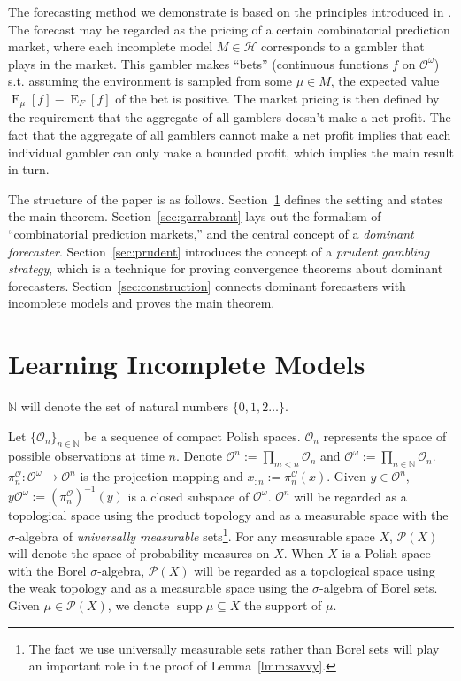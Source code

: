 \documentclass[11pt]{article}
\theoremstyle{definition}
\theoremstyle{plain}
\newcommand{\Nats}{\mathbb{N}}
\newcommand{\Sq}[2]{\{#1\}_{#2 \in \Nats}}
\newcommand{\Sqn}[1]{\Sq{#1}{n}}
\DeclareMathOperator{\E}{E}
\newcommand{\PM}{\mathcal{P}}
\DeclareMathOperator{\Sp}{supp}
\newcommand{\Ob}{\mathcal{O}}
\newcommand{\OO}{\Ob^\omega}
\newcommand{\PO}{\pi^\Ob}
\newcommand{\MC}{\mathcal{H}}
\begin{document}
The forecasting method we demonstrate is based on the principles introduced in \cite{Garrabrant_2016}. The forecast may be regarded as the pricing of a certain combinatorial prediction market, where each incomplete model $M \in \MC$ corresponds to a gambler that plays in the market. This gambler makes \enquote{bets} (continuous functions $f$ on $\OO$) s.t. assuming the environment is sampled from some $\mu \in M$, the expected value $\E_\mu[f] - \E_F[f]$ of the bet is positive. The market pricing is then defined by the requirement that the aggregate of all gamblers doesn't make a net profit. The fact that the aggregate of all gamblers cannot make a net profit implies that each individual gambler can only make a bounded profit, which implies the main result in turn.

The structure of the paper is as follows. Section~\ref{sec:learning} defines the setting and states the main theorem. Section~\ref{sec:garrabrant} lays out the formalism of \enquote{combinatorial prediction markets,} and the central concept of a \emph{dominant forecaster}. Section~\ref{sec:prudent} introduces the concept of a \emph{prudent gambling strategy}, which is a technique for proving convergence theorems about dominant forecasters. Section~\ref{sec:construction} connects dominant forecasters with incomplete models and proves the main theorem.

\section{Learning Incomplete Models}
\label{sec:learning}

$\Nats$ will denote the set of natural numbers $\{0, 1, 2 \ldots\}$.

Let $\Sqn{\Ob_n}$ be a sequence of compact Polish spaces. $\Ob_n$ represents the space of possible observations at time $n$. Denote $\Ob^n := \prod_{m < n} \Ob_n$  and $\Ob^\omega:=\prod_{n \in \Nats} \Ob_n$. $\PO_n: \Ob^\omega \rightarrow \Ob^n$ is the projection mapping and $x_{:n}:=\PO_n(x)$. Given $y \in \Ob^n$, $y\OO := (\PO_n)^{-1}(y)$ is a closed subspace of $\OO$. $\Ob^n$ will be regarded as a topological space using the product topology and as a measurable space with the $\sigma$-algebra of \emph{universally measurable} sets\footnote{The fact we use universally measurable sets rather than Borel sets will play an important role in the proof of Lemma~\ref{lmm:savvy}.}. For any measurable space $X$, $\PM(X)$ will denote the space of probability measures on $X$. When $X$ is a Polish space with the Borel $\sigma$-algebra, $\PM(X)$ will be regarded as a topological space using the weak topology and as a measurable space using the $\sigma$-algebra of Borel sets. Given $\mu \in \PM(X)$, we denote $\Sp \mu \subseteq X$ the support of $\mu$.
\end{document}
